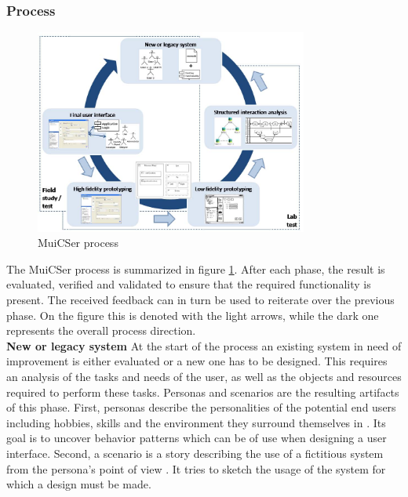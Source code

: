         \subsubsection{Process}
        
        \begin{figure}[!t]
            \centering
            \includegraphics[width=0.8\textwidth]{chapters/2_background/muicser}
            \caption{MuiCSer process}\label{fig:muicser}
        \end{figure}

        The MuiCSer process is summarized in figure \ref{fig:muicser}. After each phase, the result is evaluated, verified and validated to ensure that the required functionality is present. The received feedback can in turn be used to reiterate over the previous phase. On the figure this is denoted with the light arrows, while the dark one represents the overall process direction.\\

        \noindent\textbf{New or legacy system} At the start of the process an existing system in need of improvement is either evaluated or a new one has to be designed. This requires an analysis of the tasks and needs of the user, as well as the objects and resources required to perform these tasks. Personas and scenarios are the resulting artifacts of this phase. First, personas describe the personalities of the potential end users including hobbies, skills and the environment they surround themselves in \cite{persona_scenario}. Its goal is to uncover behavior patterns which can be of use when designing a user interface. Second, a scenario is a story describing the use of a fictitious system from the persona's point of view \cite{persona_scenario}. It tries to sketch the usage of the system for which a design must be made.\\

